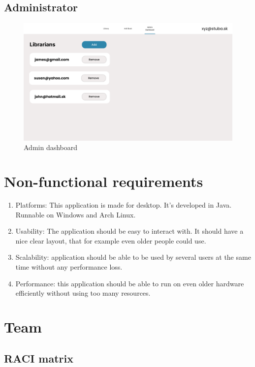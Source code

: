 \documentclass[11pt,twoside,a4paper]{article}
\begin{document}
\pagebreak
\subsection*{Administrator}

\begin{figure}[!ht]
    \includegraphics[scale=.2]{../mockups/Admin-dashboard.png}
    \centering
    \caption{Admin dashboard}
\end{figure}

\section{Non-functional requirements}

\begin{enumerate}
    \item Platforms: This application is made for desktop. It's developed in Java. Runnable on Windows and Arch Linux.
    \item Usability: The application should be easy to interact with. It should have a nice clear layout, that for example even older people could use.
    \item Scalability: application should be able to be used by several users at the same time without any performance loss.
    \item Performance: this application should be able to run on even older hardware efficiently without using too many resources.
\end{enumerate}

\pagebreak
\section{Team}

\subsection{RACI matrix}
\end{document}
